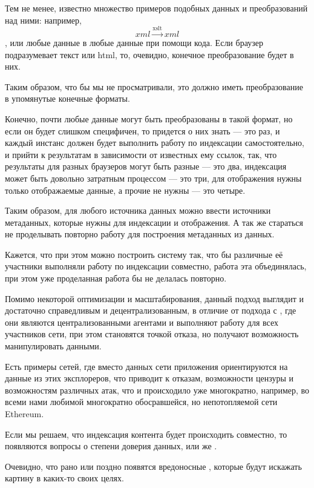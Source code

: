 Тем не менее, известно множество примеров подобных данных и преобразований над ними: например, \[
xml \xrightarrow{\text{xslt}} xml \], или любые данные в любые данные при помощи кода. Если браузер
подразумевает текст или html, то, очевидно, конечное преобразование будет в них.

Таким образом, что бы мы не просматривали, это должно иметь преобразование в упомянутые конечные
форматы.

Конечно, почти любые данные могут быть преобразованы в такой формат, но если он будет слишком
специфичен, то  придется о них знать --- это раз, и каждый инстанс
 должен будет выполнить работу по индексации самостоятельно, и
прийти к результатам в зависимости от известных ему ссылок, так, что результаты для разных браузеров
могут быть разные --- это два, индексация может быть довольно затратным процессом --- это три, для
отображения нужны только отображаемые данные, а прочие не нужны --- это четыре.

Таким образом, для любого источника данных можно ввести источники метаданных, которые нужны для
индексации и отображения. А так же стараться не проделывать повторно работу для построения
метаданных из данных.

Кажется, что при этом можно построить систему так, что бы различные её участники выполняли работу по
индексации совместно, работа эта объединялась, при этом уже проделанная работа бы не делалась
повторно.

Помимо некоторой оптимизации и масштабирования, данный подход выглядит и достаточно справедливым и
децентрализованным, в отличие от подхода с , где они
являются централизованными агентами и выполняют работу для всех участников сети, при этом становятся
точкой отказа, но получают возможность манипулировать данными.

Есть примеры сетей, где вместо данных сети приложения ориентируются на данные из этих эксплореров,
что приводит к отказам, возможности цензуры и возможностям различных атак, что и происходило уже
многократно, например, во всеми нами любимой многократно обосравшейся, но непотопляемой сети
Ethereum.

Если мы решаем, что индексация контента будет происходить совместно, то появляются вопросы о степени
доверия  данных, или же .

Очевидно, что рано или поздно появятся вредоносные , которые будут искажать
картину в каких-то своих целях.

